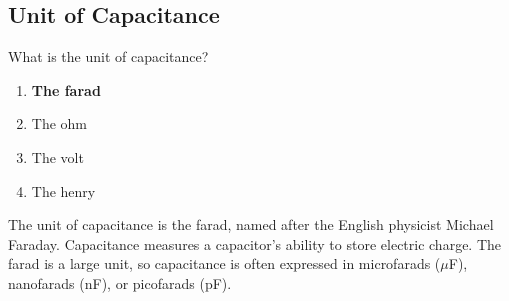 \subsection{Unit of Capacitance}
\label{T5C02}

\begin{tcolorbox}[colback=gray!10!white,colframe=black!75!black,title=T5C02]
What is the unit of capacitance?
\begin{enumerate}[noitemsep]
    \item \textbf{The farad}
    \item The ohm
    \item The volt
    \item The henry
\end{enumerate}
\end{tcolorbox}

The unit of capacitance is the farad, named after the English physicist Michael Faraday. Capacitance measures a capacitor's ability to store electric charge. The farad is a large unit, so capacitance is often expressed in microfarads ($\mu$F), nanofarads (nF), or picofarads (pF).